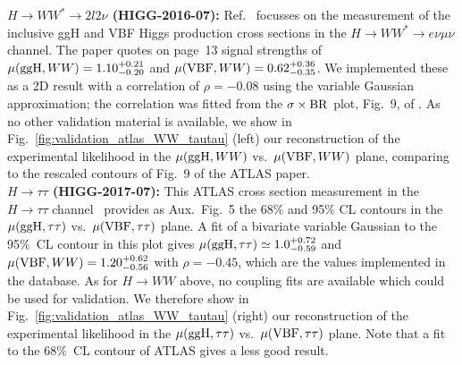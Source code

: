 
{\bf\boldmath $H\to WW^*\to 2l2\nu$ (HIGG-2016-07):} Ref.~\cite{Aaboud:2018jqu} focusses on the measurement of the 
inclusive ggH and VBF Higgs production cross sections in the $H\to WW^*\to e\nu\mu\nu$ channel. The paper quotes 
on page~13 signal strengths of $\mu({\rm ggH}, WW)=1.10^{+0.21}_{-0.20}$ and $\mu({\rm VBF}, WW)=0.62^{+0.36}_{-0.35}$. 
We implemented these as a 2D result with a correlation of $\rho=-0.08$ using the variable Gaussian approximation; 
the correlation was fitted from the $\sigma\times{\rm BR}$ plot, Fig.~9, of \cite{Aaboud:2018jqu}. 
As no other validation material is available, 
we show in Fig.~\ref{fig:validation_atlas_WW_tautau} (left) our reconstruction of the experimental likelihood in the 
$\mu({\rm ggH}, WW)$ vs.\ $\mu({\rm VBF}, WW)$ plane, comparing to the rescaled contours of Fig.~9 of the ATLAS paper.\\


{\bf\boldmath $H\to \tau\tau$ (HIGG-2017-07):} This ATLAS cross section measurement in the $H\to \tau\tau$ channel~\cite{Aaboud:2018pen} 
provides as Aux.~Fig.~5 the 68\% and 95\% CL contours in the $\mu({\rm ggH}, \tau\tau)$ vs.\ $\mu({\rm VBF}, \tau\tau)$ plane. 
A fit of a bivariate variable Gaussian to the 95\%~CL contour in this plot  
gives $\mu({\rm ggH}, \tau\tau)\simeq 1.0^{+0.72}_{-0.59}$ and $\mu({\rm VBF}, WW)=1.20^{+0.62}_{-0.56}$ with 
$\rho = -0.45$, which are the values implemented in the database. 
As for $H\to WW$ above, no coupling fits are available which could be used for validation. 
We therefore show in Fig.~\ref{fig:validation_atlas_WW_tautau} (right) our reconstruction of the experimental likelihood in the 
$\mu({\rm ggH}, \tau\tau)$ vs.\ $\mu({\rm VBF}, \tau\tau)$ plane. 
Note that a fit to the 68\%~CL contour of ATLAS gives a less good result. \\


